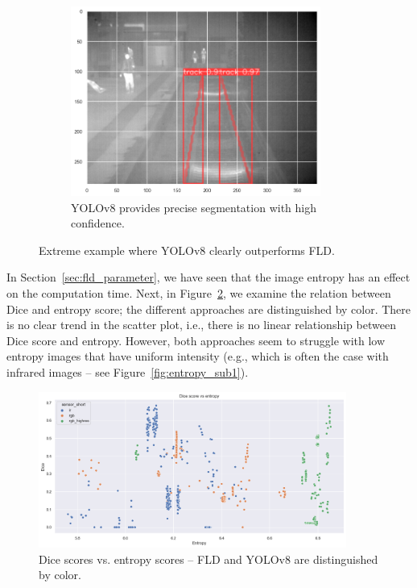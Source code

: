 \documentclass[Master,MDS,english]{BASE/twbook} %
\begin{document}
\begin{figure}
\begin{subfigure}[t]{.33\textwidth}
  \includegraphics[width=0.9\textwidth]{images/results/example_4_yolo}
  \caption{YOLOv8 provides precise segmentation with high confidence. }
\end{subfigure}
\caption{Extreme example where YOLOv8 clearly outperforms FLD.}
\label{fig:res_example4}
\end{figure}


In Section~\ref{sec:fld_parameter}, we have seen that the image entropy has an effect on the computation time. Next, in Figure~\ref{fig:dice_vs_entropy}, we examine the relation between Dice and entropy score; the different approaches are distinguished by color. There is no clear trend in the scatter plot, i.e., there is no linear relationship between Dice score and entropy. However,  both approaches seem to struggle with low entropy images that have uniform intensity  (e.g., which is often the case with infrared images -- see Figure~\ref{fig:entropy_sub1}).



\begin{figure}[h]
\centering
\includegraphics[width=0.9\textwidth]{images/results/dice_vs_entropy_nl}
\caption{Dice scores vs. entropy scores -- FLD and YOLOv8 are distinguished by color.  }
\label{fig:dice_vs_entropy}
\end{figure}
\end{document}
